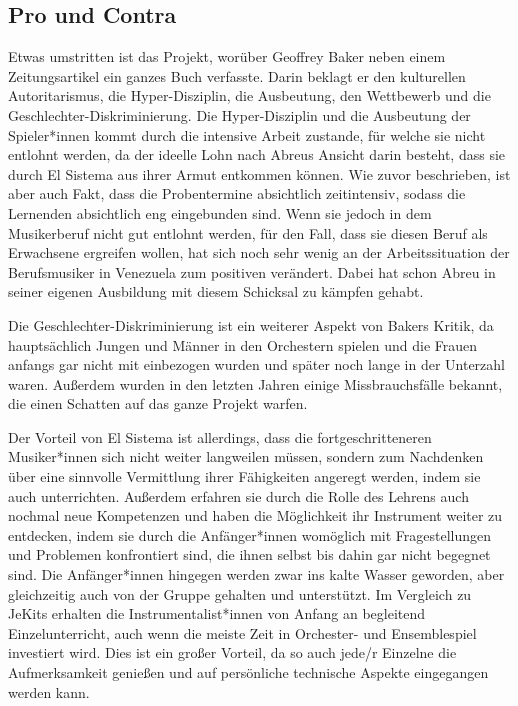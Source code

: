 \subsection{Pro und Contra}
Etwas umstritten ist das Projekt, worüber Geoffrey Baker neben einem
Zeitungsartikel ein ganzes Buch verfasste. Darin beklagt er den kulturellen
Autoritarismus, die Hyper-Disziplin, die Ausbeutung, den Wettbewerb und die
Geschlechter-Diskriminierung. Die Hyper-Disziplin und die Ausbeutung der
Spieler*innen kommt durch die intensive Arbeit zustande, für welche sie nicht
entlohnt werden, da der ideelle Lohn nach Abreus Ansicht darin besteht, dass sie
durch El Sistema aus ihrer Armut entkommen können. Wie zuvor beschrieben, ist
aber auch Fakt, dass die Probentermine absichtlich zeitintensiv, sodass die
Lernenden absichtlich eng eingebunden sind. Wenn sie jedoch in dem Musikerberuf
nicht gut entlohnt werden, für den Fall, dass sie diesen Beruf als Erwachsene
ergreifen wollen, hat sich noch sehr wenig an der Arbeitssituation der
Berufsmusiker in Venezuela zum positiven verändert. Dabei hat schon Abreu in
seiner eigenen Ausbildung mit diesem Schicksal zu kämpfen gehabt.

Die Geschlechter-Diskriminierung ist ein weiterer Aspekt von Bakers Kritik, da
hauptsächlich Jungen und Männer in den Orchestern spielen und die Frauen anfangs
gar nicht mit einbezogen wurden und später noch lange in der Unterzahl waren.
Außerdem wurden in den letzten Jahren einige Missbrauchsfälle bekannt, die einen
Schatten auf das ganze Projekt warfen. 

Der Vorteil von El Sistema ist allerdings, dass die fortgeschritteneren
Musiker*innen sich nicht weiter langweilen müssen, sondern zum Nachdenken über
eine sinnvolle Vermittlung ihrer Fähigkeiten angeregt werden, indem sie auch
unterrichten. Außerdem erfahren sie durch die Rolle des Lehrens auch nochmal
neue Kompetenzen und haben die Möglichkeit ihr Instrument weiter zu entdecken,
indem sie durch die Anfänger*innen womöglich mit Fragestellungen und Problemen
konfrontiert sind, die ihnen selbst bis dahin gar nicht begegnet sind. Die
Anfänger*innen hingegen werden zwar ins kalte Wasser geworden, aber gleichzeitig
auch von der Gruppe gehalten und unterstützt.
\autocite[160]{roebke_mantilla:vom_wilden_lernen}
Im Vergleich zu JeKits erhalten die Instrumentalist*innen von Anfang an
begleitend Einzelunterricht, auch wenn die meiste Zeit in Orchester- und
Ensemblespiel investiert wird. Dies ist ein großer Vorteil, da so auch jede/r
Einzelne die Aufmerksamkeit genießen und auf persönliche technische Aspekte
eingegangen werden kann. 
